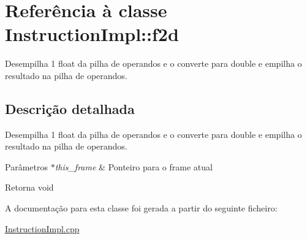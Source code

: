 \hypertarget{class_instruction_impl_1_1f2d}{}\section{Referência à classe Instruction\+Impl\+:\+:f2d}
\label{class_instruction_impl_1_1f2d}


Desempilha 1 float da pilha de operandos e o converte para double e empilha o resultado na pilha de operandos.  




\subsection{Descrição detalhada}
Desempilha 1 float da pilha de operandos e o converte para double e empilha o resultado na pilha de operandos. 


\begin{DoxyParams}{Parâmetros}
{\em $\ast$this\+\_\+frame} & Ponteiro para o frame atual \\
\hline
\end{DoxyParams}
\begin{DoxyReturn}{Retorna}
void 
\end{DoxyReturn}


A documentação para esta classe foi gerada a partir do seguinte ficheiro\+:\begin{DoxyCompactItemize}
\item 
\hyperlink{_instruction_impl_8cpp}{Instruction\+Impl.\+cpp}\end{DoxyCompactItemize}
